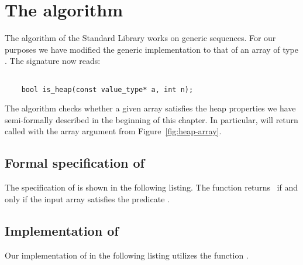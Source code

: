 
\section{The \isheap algorithm}

The \isheap algorithm of the \cxx Standard Library \cite[\S 28.7.7.5]{cxx-17-draft}
works on generic sequences. 
For our purposes we have modified the generic implementation
to that of an array of type .
The signature now reads:

\begin{lstlisting}[style = acsl-block]

    bool is_heap(const value_type* a, int n);
\end{lstlisting}

The algorithm \isheap checks whether a given array satisfies the heap properties
we have semi-formally described in the beginning of this chapter.
In particular, \isheap will return 
called with the array argument from Figure~\ref{fig:heap-array}.


\subsection{Formal specification of \isheap}

The specification of \isheap is shown in the following listing.
The function returns~ if and only if the input array
satisfies the predicate .



\subsection{Implementation of \isheap}

Our implementation of \isheap in the following listing
utilizes the function .



\clearpage

